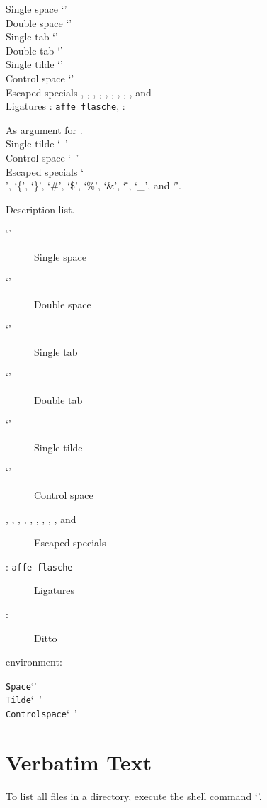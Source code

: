 \documentclass{article}
\begin{document}
\noindent
Single space ‘\code{ }’ \\
Double space ‘\code{  }’ \\
Single tab ‘\code{      }’ \\
Double tab ‘\code{          }’ \\
Single tilde ‘\code{~}’ \\
Control space ‘\code{\ }’ \\
Escaped specials \code{\\}, \code{\{}, \code{\}}, \code{\#},
\code{\$}, \code{\%}, \code{\&}, \code{\^}, \code{\_}, and \code{\~} \\
Ligatures \symb{\tt}: {\tt affe flasche},
\symb{\code}: 

\begingroup
\def\q[#1]{‘#1’}
\noindent
As argument for \symb{\q}. \\
Single tilde \q[\code{~}] \\
Control space \q[\code{\ }] \\
Escaped specials
\q[\code{\\}],
\q[\code{\{}],
\q[\code{\}}],
\q[\code{\#}],
\q[\code{\$}],
\q[\code{\%}],
\q[\code{\&}],
\q[\code{\^}],
\q[\code{\_}], and
\q[\code{\~}].
\endgroup

\noindent
Description list.
\begin{description}
\item[‘\code{ }’] Single space
\item[‘\code{  }’] Double space
\item[‘\code{      }’] Single tab
\item[‘\code{          }’] Double tab
\item[‘\code{~}’] Single tilde
\item[‘\code{\ }’] Control space
\item[\code{\\}, \code{\{}, \code{\}}, \code{\#}, \code{\$}, \code{\%},
\code{\&}, \code{\^}, \code{\_}, and \code{\~}] Escaped specials
\item[\symb{\tt}: {\tt affe flasche}] Ligatures
\item[\symb{\code}: ] Ditto
\end{description}

 environment:
\begin{alltt}
Space ‘ ’
Tilde ‘~’
Control space ‘\ ’
\end{alltt}


\section{Verbatim Text}
To list all files in a directory, execute the shell command ‘’.
\end{document}
